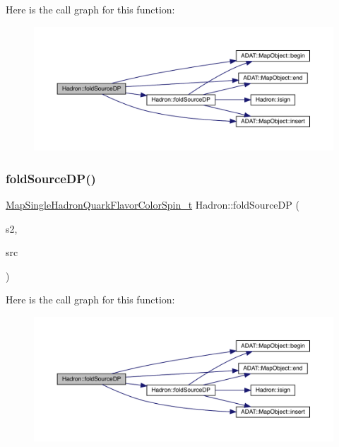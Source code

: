Here is the call graph for this function\+:\nopagebreak
\begin{figure}[H]
\begin{center}
\leavevmode
\includegraphics[width=350pt]{d1/daf/namespaceHadron_af80d375e34002f168b53c74370f8dd3a_cgraph}
\end{center}
\end{figure}
\mbox{\label{namespaceHadron_a273b8ceda53ab61615d67cead7c42d94}} 
\subsubsection{\texorpdfstring{foldSourceDP()}{foldSourceDP()}\hspace{0.1cm}{\footnotesize\ttfamily [7/7]}}
{\footnotesize\ttfamily \mbox{\hyperlink{namespaceHadron_a03b319764f85c20434f20a269ce5f388}{Map\+Single\+Hadron\+Quark\+Flavor\+Color\+Spin\+\_\+t}} Hadron\+::fold\+Source\+DP (\begin{DoxyParamCaption}\item[{const \mbox{\hyperlink{namespaceHadron_a03b319764f85c20434f20a269ce5f388}{Map\+Single\+Hadron\+Quark\+Flavor\+Color\+Spin\+\_\+t}} \&}]{s2,  }\item[{bool}]{src }\end{DoxyParamCaption})}

Here is the call graph for this function\+:\nopagebreak
\begin{figure}[H]
\begin{center}
\leavevmode
\includegraphics[width=350pt]{d1/daf/namespaceHadron_a273b8ceda53ab61615d67cead7c42d94_cgraph}
\end{center}
\end{figure}
\mbox{\label{namespaceHadron_aa0ad60c011c7668c5389ce9286b3c8dd}} 

